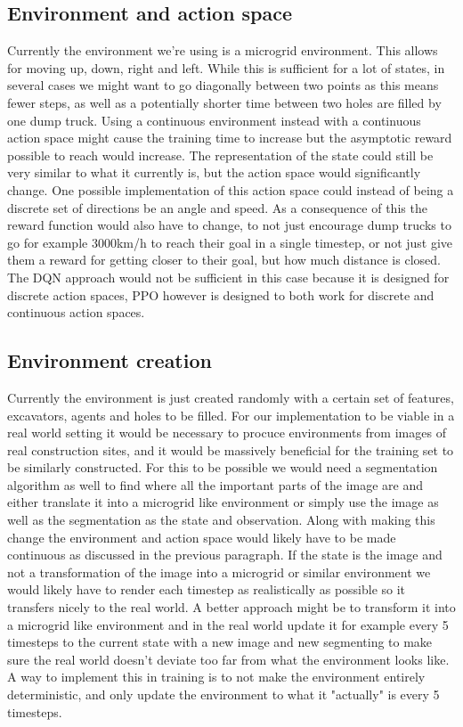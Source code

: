 \documentclass[conference]{IEEEtran}
\begin{document}
\subsection{Environment and action space}
Currently the environment we're using is a microgrid environment. This allows for moving up, down, right and left.
While this is sufficient for a lot of states, in several cases we might want to go diagonally between two points as this means fewer steps, as well as a potentially shorter time between two holes are filled by one dump truck.
Using a continuous environment instead with a continuous action space might cause the training time to increase but the asymptotic reward possible to reach would increase. The representation of the state could still be very similar to what it currently is, but the action space would significantly change.
One possible implementation of this action space could instead of being a discrete set of directions be an angle and speed.
As a consequence of this the reward function would also have to change, to not just encourage dump trucks to go for example 3000km/h to reach their goal in a single timestep, or not just give them a reward for getting closer to their goal, but how much distance is closed.
The DQN approach would not be sufficient in this case because it is designed for discrete action spaces, PPO however is designed to both work for discrete and continuous action spaces.

\subsection{Environment creation}
Currently the environment is just created randomly with a certain set of features, excavators, agents and holes to be filled.
For our implementation to be viable in a real world setting it would be necessary to procuce environments from images of real construction sites, and it would be massively beneficial for the training set to be similarly constructed.
For this to be possible we would need a segmentation algorithm as well to find where all the important parts of the image are and either translate it into a microgrid like environment or simply use the image as well as the segmentation as the state and observation.
Along with making this change the environment and action space would likely have to be made continuous as discussed in the previous paragraph.
If the state is the image and not a transformation of the image into a microgrid or similar environment we would likely have to render each timestep as realistically as possible so it transfers nicely to the real world.
A better approach might be to transform it into a microgrid like environment and in the real world update it for example every 5 timesteps to the current state with a new image and new segmenting to make sure the real world doesn't deviate too far from what the environment looks like.
A way to implement this in training is to not make the environment entirely deterministic, and only update the environment to what it "actually" is every 5 timesteps.
\end{document}
